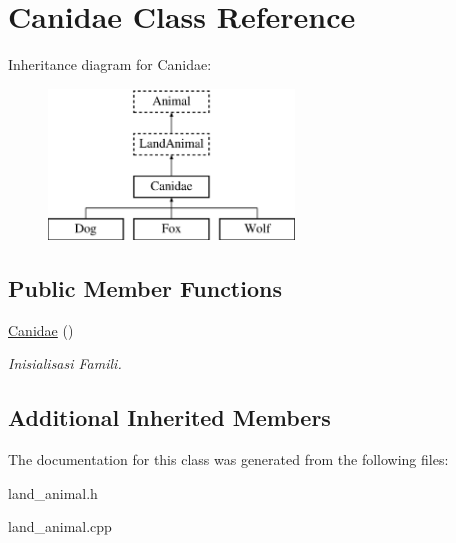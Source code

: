\hypertarget{class_canidae}{}\section{Canidae Class Reference}
\label{class_canidae}
Inheritance diagram for Canidae\+:\begin{figure}[H]
\begin{center}
\leavevmode
\includegraphics[height=4.000000cm]{class_canidae}
\end{center}
\end{figure}
\subsection*{Public Member Functions}
\begin{DoxyCompactItemize}
\item 
\hyperlink{class_canidae_ac4809b29d6c43068b3d8034414d09bc2}{Canidae} ()\hypertarget{class_canidae_ac4809b29d6c43068b3d8034414d09bc2}{}\label{class_canidae_ac4809b29d6c43068b3d8034414d09bc2}

\begin{DoxyCompactList}\small\item\em Inisialisasi Famili. \end{DoxyCompactList}\end{DoxyCompactItemize}
\subsection*{Additional Inherited Members}


The documentation for this class was generated from the following files\+:\begin{DoxyCompactItemize}
\item 
land\+\_\+animal.\+h\item 
land\+\_\+animal.\+cpp\end{DoxyCompactItemize}
